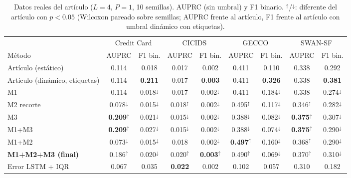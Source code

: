 \begin{table}[t]
\centering\small
\caption{Datos reales del artículo ($L{=}4$, $P{=}1$, 10 semillas). AUPRC (sin umbral) y F1 binario. $^{\uparrow}$/$^{\downarrow}$: diferente del artículo con $p<0.05$ (Wilcoxon pareado sobre semillas; AUPRC frente al artículo, F1 frente al artículo con umbral dinámico con etiquetas).}
\label{tab:real}
\begin{tabular}{lcccccccc}
\toprule
& \multicolumn{2}{c}{Credit Card} & \multicolumn{2}{c}{CICIDS} & \multicolumn{2}{c}{GECCO} & \multicolumn{2}{c}{SWAN-SF} \\
\cmidrule(lr){2-3} \cmidrule(lr){4-5} \cmidrule(lr){6-7} \cmidrule(lr){8-9}
Método & AUPRC & F1 bin. & AUPRC & F1 bin. & AUPRC & F1 bin. & AUPRC & F1 bin. \\
\midrule
Artículo (estático) & 0.114 & 0.018 & 0.017 & 0.002 & 0.411 & 0.110 & 0.338 & 0.292 \\
Artículo (dinámico, etiquetas) & 0.114 & \textbf{0.211} & 0.017 & \textbf{0.003} & 0.411 & \textbf{0.326} & 0.338 & \textbf{0.381} \\
\midrule
M1 & 0.114 & 0.018$^{\downarrow}$ & 0.017 & 0.002$^{\downarrow}$ & 0.411 & 0.184$^{\downarrow}$ & 0.338 & 0.274$^{\downarrow}$ \\
M2 recorte & 0.078$^{\downarrow}$ & 0.015$^{\downarrow}$ & 0.018$^{\uparrow}$ & 0.002$^{\downarrow}$ & 0.495$^{\uparrow}$ & 0.117$^{\downarrow}$ & 0.346$^{\uparrow}$ & 0.282$^{\downarrow}$ \\
M3 & \textbf{0.209$^{\uparrow}$} & 0.021$^{\downarrow}$ & 0.015$^{\downarrow}$ & 0.002$^{\downarrow}$ & 0.388$^{\downarrow}$ & 0.082$^{\downarrow}$ & \textbf{0.375$^{\uparrow}$} & 0.307$^{\downarrow}$ \\
M1+M3 & \textbf{0.209$^{\uparrow}$} & 0.027$^{\downarrow}$ & 0.015$^{\downarrow}$ & 0.002$^{\downarrow}$ & 0.388$^{\downarrow}$ & 0.074$^{\downarrow}$ & \textbf{0.375$^{\uparrow}$} & 0.290$^{\downarrow}$ \\
M1+M2 & 0.073$^{\downarrow}$ & 0.015$^{\downarrow}$ & 0.018 & 0.002$^{\downarrow}$ & \textbf{0.497$^{\uparrow}$} & 0.160$^{\downarrow}$ & 0.368$^{\uparrow}$ & 0.290$^{\downarrow}$ \\
\midrule
\textbf{M1+M2+M3 (final)} & 0.186$^{\uparrow}$ & 0.020$^{\downarrow}$ & 0.020$^{\uparrow}$ & \textbf{0.003$^{\uparrow}$} & 0.490$^{\uparrow}$ & 0.069$^{\downarrow}$ & 0.370$^{\uparrow}$ & 0.310$^{\downarrow}$ \\
\midrule
Error LSTM + IQR & 0.067 & 0.035 & \textbf{0.022} & 0.002 & 0.102 & 0.057 & 0.310 & 0.182 \\
\bottomrule
\end{tabular}
\end{table}
